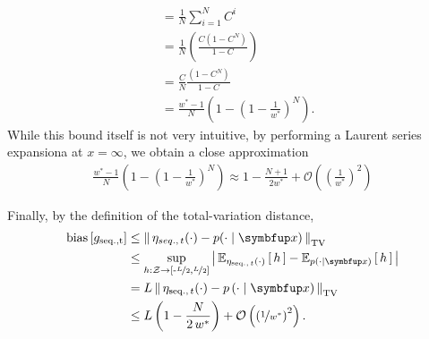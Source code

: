 \begin{proofEnd}
\begin{align}
    &=    \frac{1}{N} \sum_{i=1}^N C^i \\
    &=    \frac{1}{N} \left(\frac{ C \left(1 - C^{N}\right)}{1 - C}\right) \\
    &=    \frac{C}{N} \frac{ \left(1 - C^{N}\right) }{1 - C} \\
    &=  \frac{w^* - 1}{N} \left( 1 - {\left( 1 - \frac{1}{w^*} \right) }^N \right).
  \end{align}
  While this bound itself is not very intuitive, by performing a Laurent series expansiona at \(x = \infty\), we obtain a close approximation
  \begin{align}
    \frac{w^* - 1}{N} \left( 1 - {\left( 1 - \frac{1}{w^*} \right) }^N \right)
    \approx 1 - \frac{N+1}{2 w^*} + \mathcal{O}\left({\left(\frac{1}{w^*}\right)}^2\right)
  \end{align}

  Finally, by the definition of the total-variation distance, 
 \begin{align}
   \mathrm{bias}\left[ g_{\mathrm{seq., t}} \right]
   &\leq \DTV{\eta_{seq.,\, t}(\cdot)}{p(\cdot\mid\vx)} \\
   &\leq \sup_{h : \mathcal{Z} \rightarrow \left[ \text{-}\nicefrac{L}{2}, \nicefrac{L}{2} \right]} \left|\, \Esub{\eta_{\mathrm{seq.},\, t}(\cdot)}{h} - \Esub{p(\cdot\mid\vx)}{h} \,\right| \\
   &= L \, \DTV{ \eta_{\mathrm{seq.},\, t}(\cdot) }{p\left(\cdot\mid\vx\right)}  \\
   &\leq L \left( 1 - \frac{N}{2 \, w^*} \right) + \mathcal{O}\left({\left(\nicefrac{1}{w^*}\right)}^2\right).
 \end{align}
\end{proofEnd}

